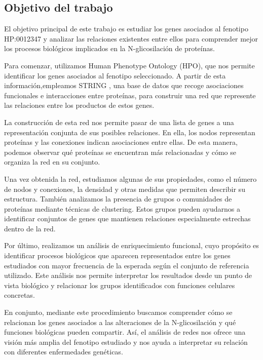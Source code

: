 \subsection{Objetivo del trabajo}

El objetivo principal de este trabajo es estudiar los genes asociados al fenotipo HP:0012347 y analizar las relaciones existentes entre ellos para comprender mejor los procesos biológicos implicados en la N-glicosilación de proteínas.

Para comenzar, utilizamos Human Phenotype Ontology (HPO), que nos permite identificar los genes asociados al fenotipo seleccionado. A partir de esta información,empleamos STRING  \cite{Szklarczyk2023}, una base de datos que recoge asociaciones funcionales e interacciones entre proteínas, para construir una red que represente las relaciones entre los productos de estos genes.

La construcción de esta red nos permite pasar de una lista de genes a una representación conjunta de sus posibles relaciones. En ella, los nodos representan proteínas y las conexiones indican asociaciones entre ellas. De esta manera, podemos observar qué proteínas se encuentran más relacionadas y cómo se organiza la red en su conjunto.

Una vez obtenida la red, estudiamos algunas de sus propiedades, como el número de nodos y conexiones, la densidad y otras medidas que permiten describir su estructura. También analizamos la presencia de grupos o comunidades de proteínas mediante técnicas de clustering. Estos grupos pueden ayudarnos a identificar conjuntos de genes que mantienen relaciones especialmente estrechas dentro de la red.

Por último, realizamos un análisis de enriquecimiento funcional, cuyo propósito es identificar procesos biológicos que aparecen representados entre los genes estudiados con mayor frecuencia de la esperada según el conjunto de referencia utilizado. Este análisis nos permite interpretar los resultados desde un punto de vista biológico y relacionar los grupos identificados con funciones celulares concretas.

En conjunto, mediante este procedimiento buscamos comprender cómo se relacionan los genes asociados a las alteraciones de la N-glicosilación y qué funciones biológicas pueden compartir. Así, el análisis de redes nos ofrece una visión más amplia del fenotipo estudiado y nos ayuda a interpretar su relación con diferentes enfermedades genéticas.
